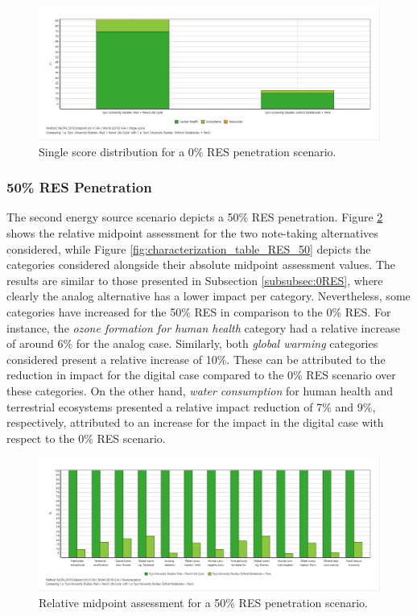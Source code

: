 \begin{figure}[H]
    \centering
    \includegraphics[width=\textwidth]{images/RES_0/Single_Score_RES_0.JPG}
    \caption{Single score distribution for a 0\% RES penetration scenario.}\label{fig:single_score_RES0}
\end{figure}

\subsubsection{50\% RES Penetration}

The second energy source scenario depicts a 50\% RES penetration. Figure \ref*{fig:characterization_RES_50} shows the relative midpoint assessment for the two note-taking alternatives considered, while Figure \ref{fig:characterization_table_RES_50} depicts the categories considered alongside their absolute midpoint assessment values. The results are similar to those presented in Subsection \ref{subsubsec:0RES}, where clearly the analog alternative has a lower impact per category. Nevertheless, some categories have increased for the 50\% RES in comparison to the 0\% RES. For instance, the \textit{ozone formation for human health} category had a relative increase of around 6\% for the analog case. Similarly, both \textit{global warming} categories considered present a relative increase of 10\%. These can be attributed to the reduction in impact for the digital case compared to the 0\% RES scenario over these categories. On the other hand, \textit{water consumption} for human health and terrestrial ecosystems presented a relative impact reduction of 7\% and 9\%, respectively, attributed to an increase for the impact in the digital case with respect to the 0\% RES scenario. 

\begin{figure}[H]
    \centering
    \includegraphics[width=\textwidth]{images/RES_50/Characterization_RES_50.JPG}
    \caption{Relative midpoint assessment for a 50\% RES penetration scenario.}\label{fig:characterization_RES_50}
\end{figure}

